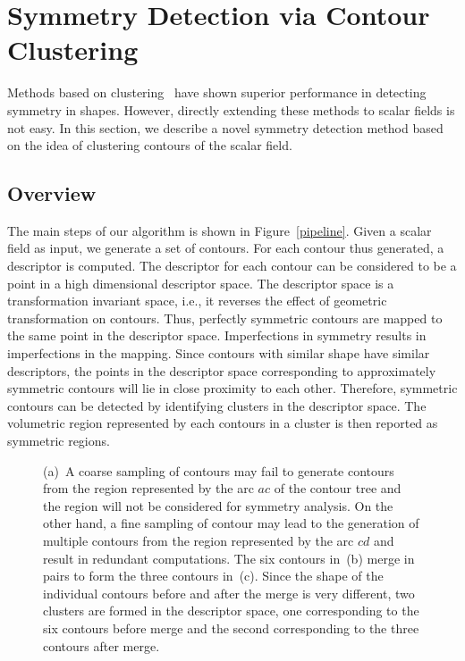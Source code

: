 \documentclass[review,journal]{vgtc}         %
\begin{document}
\section{Symmetry Detection via Contour Clustering}
Methods based on clustering~\cite{Mitra06,Lip10,MitraGP07,Xu12,RavBBK10,Xu09}
have shown superior performance in detecting
symmetry in shapes. However, directly extending these methods to scalar fields
is not easy. In this section, we describe a novel symmetry detection method
based on the idea of clustering contours of the scalar field.
\subsection{Overview}
The main steps of our algorithm is shown in Figure~\ref{pipeline}.
Given a scalar field as input, we generate a set of contours. For each contour
thus generated, a descriptor is computed. The descriptor for each contour
can be considered to be a point in a high dimensional 
descriptor space. The descriptor space is a transformation invariant space,
i.e., it reverses the effect of geometric transformation on contours. Thus, perfectly
symmetric contours are mapped to the same point in the descriptor space.
Imperfections in symmetry results in imperfections in the mapping.
Since contours with similar shape have similar descriptors,
the points in the descriptor space corresponding to approximately symmetric 
contours will lie in close proximity to each other. Therefore, symmetric contours
can be detected by identifying clusters in the descriptor space. The volumetric
region represented by each contours in a cluster is then reported as
symmetric regions.
\begin{figure}[t]
	\centering
	\hspace{0.2cm}
	\caption{(a)~A coarse sampling of contours may fail to generate 
		contours from the region represented by the arc $ac$ of the contour tree
		and the region will not be considered for symmetry analysis.
		On the other hand, a fine sampling of contour may lead to the generation
		of multiple contours from the region represented by the arc $cd$ and
	result in redundant computations. The six contours in~(b) merge in pairs to form
the three contours in~(c). Since the shape of the individual contours before and after the merge is 
very different, two clusters are formed in the descriptor space, one corresponding to the
six contours before merge and the second corresponding to the three contours after merge.}
\end{figure}
\end{document}
